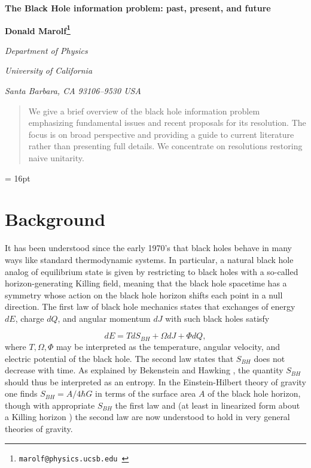 \documentclass[12pt]{article}
\begin{document}



\begin{titlepage}
\bigskip
\bigskip\bigskip\bigskip
\centerline{\Large \bf The Black Hole information problem: past, present, and future}

\bigskip\bigskip\bigskip
\bigskip\bigskip\bigskip


 \centerline
 {\bf Donald Marolf\footnote{\tt marolf@physics.ucsb.edu }}
 \medskip


\centerline{\em Department of Physics}
\centerline{\em University of California}
\centerline{\em Santa Barbara, CA 93106--9530 USA}

\bigskip\bigskip\bigskip

\bigskip\bigskip\bigskip


\begin{abstract}
We give a brief overview of the black hole information problem emphasizing fundamental issues and recent proposals for its resolution.  The focus is on broad perspective and providing a guide to current literature rather than presenting full details.  We concentrate on resolutions restoring naive unitarity.
\end{abstract}
\end{titlepage}

\baselineskip = 16pt


\section{Background}

It has been understood since the early 1970's that black holes behave in many ways like standard thermodynamic systems.  In particular, a natural black hole analog of equilibrium state is given by restricting to black holes with a so-called horizon-generating Killing field, meaning that the black hole spacetime has a symmetry whose action on the black hole horizon shifts each point in a null direction.  The first law of black hole mechanics states that exchanges of energy $dE$, charge $dQ$, and angular momentum $dJ$ with such black holes satisfy

\begin{equation}
\label{FirstLaw}
dE = T dS_{BH} + \Omega dJ + \Phi dQ,
\end{equation}
where $T, \Omega, \Phi$ may be interpreted as the temperature, angular velocity, and electric potential of the black hole.   The second law states that $S_{BH}$ does not decrease with time.  As explained by Bekenstein \cite{Bekenstein:1973ur} and Hawking \cite{Hawking:1974sw}, the quantity $S_{BH}$ should thus be interpreted as an entropy.   In the Einstein-Hilbert theory of gravity one finds $S_{BH} = A/4\hbar G$ in terms of the surface area $A$ of the black hole horizon, though with appropriate $S_{BH}$ the first law \cite{Wald:1993nt} and (at least in linearized form about a Killing horizon \cite{Wall:2015raa}) the second law are now understood to hold  in very general theories of gravity.
\end{document}
